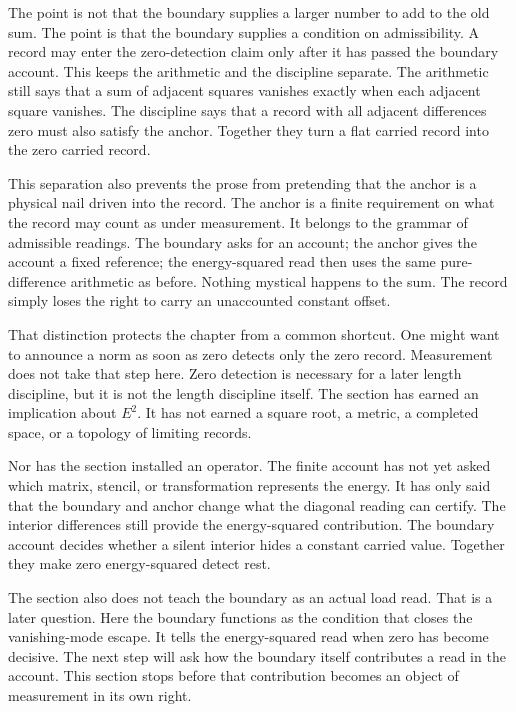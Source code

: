 The point is not that the boundary supplies a larger number to add to the old
sum. The point is that the boundary supplies a condition on admissibility. A
record may enter the zero-detection claim only after it has passed the
boundary account. This keeps the arithmetic and the discipline separate. The
arithmetic still says that a sum of adjacent squares vanishes exactly when
each adjacent square vanishes. The discipline says that a record with all
adjacent differences zero must also satisfy the anchor. Together they turn a
flat carried record into the zero carried record.

This separation also prevents the prose from pretending that the anchor is a
physical nail driven into the record. The anchor is a finite requirement on
what the record may count as under measurement. It belongs to the grammar of
admissible readings. The boundary asks for an account; the anchor gives the
account a fixed reference; the energy-squared read then uses the same
pure-difference arithmetic as before. Nothing mystical happens to the sum. The
record simply loses the right to carry an unaccounted constant offset.

That distinction protects the chapter from a common shortcut. One might want
to announce a norm as soon as zero detects only the zero record. Measurement
does not take that step here. Zero detection is necessary for a later length
discipline, but it is not the length discipline itself. The section has earned
an implication about \(E^2\). It has not earned a square root, a metric, a
completed space, or a topology of limiting records.

Nor has the section installed an operator. The finite account has not yet
asked which matrix, stencil, or transformation represents the energy. It has
only said that the boundary and anchor change what the diagonal reading can
certify. The interior differences still provide the energy-squared
contribution. The boundary account decides whether a silent interior hides a
constant carried value. Together they make zero energy-squared detect rest.

The section also does not teach the boundary as an actual load read. That is a
later question. Here the boundary functions as the condition that closes the
vanishing-mode escape. It tells the energy-squared read when zero has become
decisive. The next step will ask how the boundary itself contributes a read in
the account. This section stops before that contribution becomes an object of
measurement in its own right.

